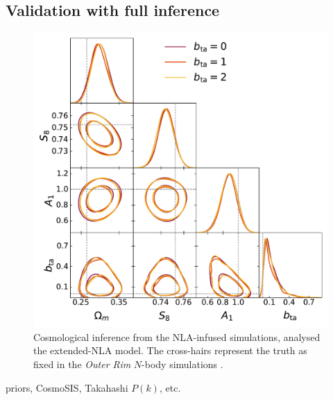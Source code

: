 \subsection{Validation with full inference}
 \label{sec:inference}
\begin{figure}
\includegraphics[width=\columnwidth]{graphs/triangle_bta_sweep.pdf}
\caption{Cosmological inference from the NLA-infused simulations, analysed the extended-NLA model. 
The cross-hairs represent the truth as fixed in the {\it Outer Rim} $N$-body simulations \citep{OuterRim}.}
\label{fig:triangle_nla}
\end{figure}
priors, {\sc CosmoSIS}, Takahashi $P(k)$, etc.





